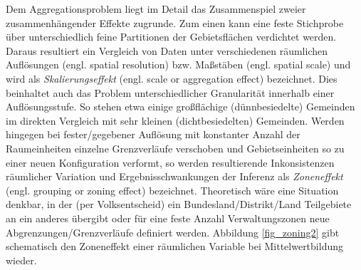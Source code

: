 Dem Aggregationsproblem liegt im Detail das Zusammenspiel zweier zusammenhängender Effekte zugrunde. 
Zum einen kann eine feste Stichprobe über unterschiedlich feine Partitionen der Gebietsflächen verdichtet werden. 
Daraus resultiert ein Vergleich von Daten unter verschiedenen räumlichen Auflösungen (engl. spatial resolution) bzw. Maßstäben (engl. spatial scale)
und wird als \emph{Skalierungseffekt} (engl. scale or aggregation effect) bezeichnet.
Dies beinhaltet auch das Problem unterschiedlicher Granularität innerhalb einer Auflösungsstufe. 
So stehen etwa einige großflächige (dünnbesiedelte) Gemeinden im direkten Vergleich mit sehr kleinen (dichtbesiedelten) Gemeinden.
Werden hingegen bei fester/gegebener Auflösung mit konstanter Anzahl der Raumeinheiten einzelne Grenzverläufe verschoben und Gebietseinheiten so zu einer neuen Konfiguration verformt, 
so werden resultierende Inkonsistenzen räumlicher Variation und Ergebnisschwankungen der Inferenz als \emph{Zoneneffekt} (engl. grouping or zoning effect) bezeichnet. 
Theoretisch wäre eine Situation denkbar, in der (per Volksentscheid) ein Bundesland/Distrikt/Land Teilgebiete an ein anderes übergibt 
oder für eine feste Anzahl Verwaltungszonen neue Abgrenzungen/Grenzverläufe definiert werden.
Abbildung \ref{fig_zoning2} gibt schematisch den Zoneneffekt einer räumlichen Variable bei Mittelwertbildung wieder.

